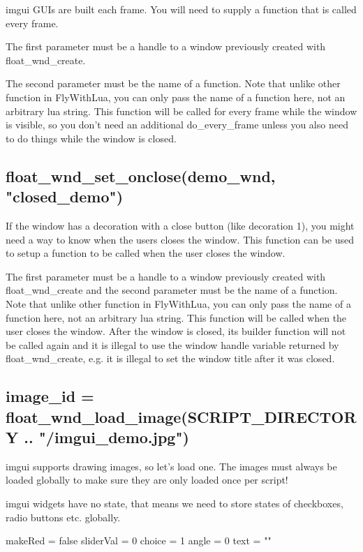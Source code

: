 \documentclass[11pt,parskip=half,a4paper]{scrartcl}
\begin{document}
imgui GUIs are built each frame. You will need to supply a function that is called every frame.

The first parameter must be a handle to a window previously created with float\_wnd\_create.

The second parameter must be the name of a function. Note that unlike other function in FlyWithLua, you
can only pass the name of a function here, not an arbitrary lua string. This function will be called for
every frame while the window is visible, so you don't need an additional do\_every\_frame unless you
also need to do things while the window is closed.

\subsection{float\_wnd\_set\_onclose(demo\_wnd, "closed\_demo")}

If the window has a decoration with a close button (like decoration 1), you might need a way to know when the users closes the window. This function can be used to setup a function to be called when the user closes the window.

The first parameter must be a handle to a window previously created with float\_wnd\_create and the second parameter must be the name of a function. Note that unlike other function in FlyWithLua, you
can only pass the name of a function here, not an arbitrary lua string. This function will be called
when the user closes the window. After the window is closed, its builder function will not be called
again and it is illegal to use the window handle variable returned by float\_wnd\_create, e.g. it is illegal
to set the window title after it was closed.

\newpage

\subsection{image\_id = float\_wnd\_load\_image(SCRIPT\_DIRECTORY .. "/imgui\_demo.jpg")}

imgui supports drawing images, so let's load one. The images must always be loaded globally to make sure they are only loaded once per script!

imgui widgets have no state, that means we need to store states of checkboxes, radio buttons etc. globally.

makeRed = false
\newline
sliderVal = 0
\newline
choice = 1
\newline
angle = 0
\newline
text = ""
\end{document}
